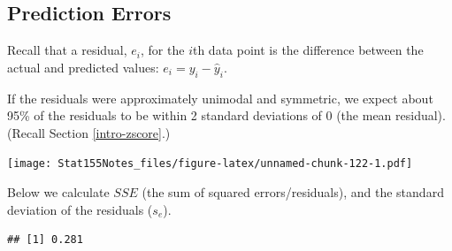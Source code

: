 \documentclass[]{book}
\newenvironment{Shaded}{\begin{snugshade}}{\end{snugshade}}
\newcommand{\CommentTok}[1]{\textcolor[rgb]{0.56,0.35,0.01}{\textit{#1}}}
\newcommand{\DataTypeTok}[1]{\textcolor[rgb]{0.13,0.29,0.53}{#1}}
\newcommand{\DecValTok}[1]{\textcolor[rgb]{0.00,0.00,0.81}{#1}}
\newcommand{\KeywordTok}[1]{\textcolor[rgb]{0.13,0.29,0.53}{\textbf{#1}}}
\newcommand{\NormalTok}[1]{#1}
\newcommand{\OperatorTok}[1]{\textcolor[rgb]{0.81,0.36,0.00}{\textbf{#1}}}
\newcommand{\StringTok}[1]{\textcolor[rgb]{0.31,0.60,0.02}{#1}}
\begin{document}
\hypertarget{prediction-errors}{%
\subsection{Prediction Errors}\label{prediction-errors}}

Recall that a residual, \(e_i\), for the \(i\)th data point is the difference between the actual and predicted values: \(e_i = y_i - \hat{y}_i\).

If the residuals were approximately unimodal and symmetric, we expect about 95\% of the residuals to be within 2 standard deviations of 0 (the mean residual). (Recall Section \ref{intro-zscore}.)

\begin{Shaded}
\end{Shaded}

\texttt{[image: Stat155Notes\_files/figure-latex/unnamed-chunk-122-1.pdf]}

Below we calculate \(SSE\) (the sum of squared errors/residuals), and the standard deviation of the residuals (\(s_e\)).

\begin{Shaded}
\end{Shaded}

\begin{verbatim}
## [1] 0.281
\end{verbatim}
\end{document}
